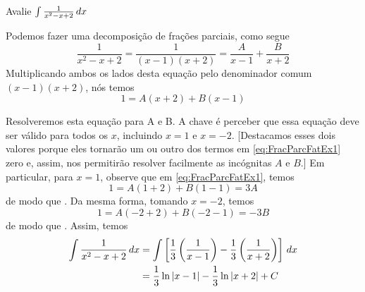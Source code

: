 \cleardoublepage\documentclass[../main.tex]{subfiles}
\begin{document}
\begin{ex}~\label{Ex:FracParcFatLineares}
\\ Avalie  $\int \frac{1}{x^2-x+2} \, dx$
\begin{sol}
Podemos fazer uma decomposição de frações parciais, como segue
\begin{equation*}
    \frac{1}{x^2-x+2}=\frac{1}{(x-1)(x+2)}=\frac{A}{x-1}+\frac{B}{x+2}
\end{equation*}
Multiplicando ambos os lados desta equação pelo denominador comum $(x-1)(x+2)$, nós temos
\begin{equation}
1=A(x+2)+B(x-1)\label{eq:FracParcFatEx1}
\end{equation}

Resolveremos esta  equação para A e B. A chave é perceber que essa equação deve ser válido para todos os $x$, incluindo $x = 1$ e $x = -2$. [Destacamos esses dois valores porque eles tornarão um ou outro dos termos em \ref{eq:FracParcFatEx1} zero e, assim, nos permitirão resolver facilmente as incógnitas $A$ e $B$.] Em particular, para $x = 1$, observe que em \ref{eq:FracParcFatEx1}, temos
\begin{equation*}
1 = A (1 + 2) + B (1 - 1) = 3 A 
\end{equation*}
de modo que . Da mesma forma, tomando $x = -2$, temos
\begin{equation*}
 1= A ( -2 + 2) + B ( -2 - 1) = -3 B
\end{equation*}
de modo que .  Assim, temos
\begin{align*}
\int \frac{1}{x^2-x+2}\, dx&=\int \left[\frac{1}{3}\left(\frac{1}{x-1}\right)-\frac{1}{3}\left(\frac{1}{x+2}\right)\right]\, dx\\
&=\frac{1}{3}\ln |x-1|-\frac{1}{3}\ln |x+2|+C
\end{align*}
\end{sol}
\end{ex}
\end{document}
